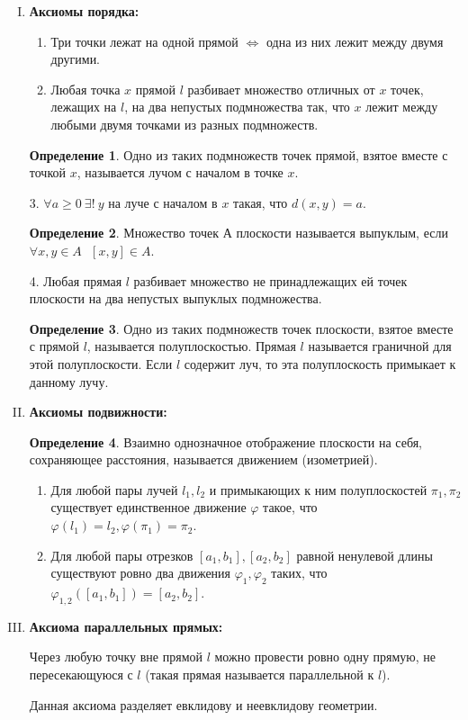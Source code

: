 \documentclass[a4paper, 12pt]{article}
\renewcommand{\phi}{\varphi}
\theoremstyle{definition}
\newtheorem*{definition}{Определение}
\begin{document}
\begin{enumerate}[I.]
		\item \bfseries Аксиомы порядка: \mdseries
		\begin{enumerate}[1.]
			\item Три точки лежат на одной прямой $\Leftrightarrow$ одна из них лежит между двумя другими.
			\item Любая точка $x$ прямой $l$ разбивает множество отличных от $x$ точек, лежащих на $l$, на два непустых подмножества так, что $x$ лежит между любыми двумя точками из разных подмножеств.
		\end{enumerate}
		\begin{definition}
			Одно из таких подмножеств точек прямой, взятое вместе с точкой $x$, называется лучом с началом в точке $x$.
		\end{definition}
		3. $\forall a\geqslant0 \ \exists!\ y$ на луче с началом в $x$ такая, что $d(x, y) = a$.
		\begin{definition}
		    Множество точек А плоскости называется выпуклым, если $\forall x, y\in A \ \ \ [x, y]\in A$.
		\end{definition}
		4. Любая прямая $l$ разбивает множество не принадлежащих ей точек плоскости на два непустых выпуклых подмножества.
		\begin{definition}
			Одно из таких подмножеств точек плоскости, взятое вместе с прямой $l$, называется полуплоскостью. Прямая $l$ называется граничной для этой полуплоскости. Если $l$ содержит луч, то эта полуплоскость примыкает к данному лучу.  
		\end{definition}
		\item \bfseries Аксиомы подвижности: \mdseries
		\begin{definition}
			Взаимно однозначное отображение плоскости на себя, сохраняющее расстояния, называется движением (изометрией).
		\end{definition}
		\begin{enumerate}[1.]
			\item Для любой пары лучей $l_{1}, l_{2}$ и примыкающих к ним полуплоскостей $\pi_{1}, \pi_{2}$ существует единственное движение $\phi$ такое, что $\phi(l_{1}) = l_{2}, \phi(\pi_{1}) = \pi_{2} $.
			\item  Для любой пары отрезков $[a_{1}, b_{1}], [a_{2}, b_{2}]$ равной ненулевой длины существуют ровно два движения $\phi_{1}, \phi_{2}$ таких, что $\phi_{1,2}([a_{1}, b_{1}]) = [a_{2}, b_{2}]$.
		\end{enumerate}
		\item \bfseries Аксиома параллельных прямых: \mdseries
		
		Через любую точку вне прямой $l$ можно провести ровно одну прямую, не пересекающуюся с $l$ (такая прямая называется параллельной к $l$).
		
		Данная аксиома разделяет евклидову и неевклидову геометрии.
	\end{enumerate}
	
\end{document}
